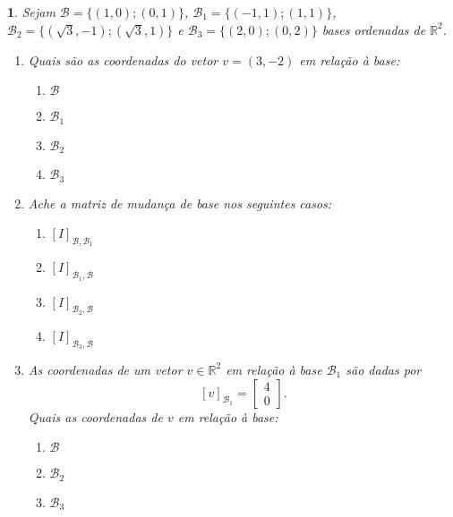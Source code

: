 \documentclass[12pt]{exam}
\newtheorem{exercicio}{}
\newcommand{\real}{\mathbb{R}}
\begin{document}
\begin{exercicio}
  Sejam $\mathcal{B} = \{(1,0);(0,1)\}$, $\mathcal{B}_1 = \{(-1,1);(1,1)\}$, $\mathcal{B}_2 = \{(\sqrt{3},-1);(\sqrt{3},1)\}$ e $\mathcal{B}_3 = \{(2,0);(0,2)\}$ bases ordenadas de $\real^2$.
  \begin{enumerate}[label=({\alph*})]
    \item Quais s\~ao as coordenadas do vetor $v = (3,-2)$ em rela\c{c}\~ao \`a base:
    \begin{enumerate}[label=({\roman*})]
      \item $\mathcal{B}$
      \item $\mathcal{B}_1$
      \item $\mathcal{B}_2$
      \item $\mathcal{B}_3$
    \end{enumerate}
    \item Ache a matriz de mudan\c{c}a de base nos seguintes casos:
    \begin{enumerate}[label=({\roman*})]
      \item $[I]_{\mathcal{B},\mathcal{B}_1}$
      \item $[I]_{\mathcal{B}_1,\mathcal{B}}$
      \item $[I]_{\mathcal{B}_2,\mathcal{B}}$
      \item $[I]_{\mathcal{B}_3,\mathcal{B}}$
    \end{enumerate}
    \item As coordenadas de um vetor $v \in \real^2$ em rela\c{c}\~ao \`a base $\mathcal{B}_1$ s\~ao dadas por
    \[
      [v]_{\mathcal{B}_1} = \begin{bmatrix}
        4\\0
      \end{bmatrix}.
    \]
    Quais as coordenadas de $v$ em rela\c{c}\~ao \`a base:
    \begin{enumerate}[label=({\roman*})]
      \item $\mathcal{B}$
      \item $\mathcal{B}_2$
      \item $\mathcal{B}_3$
    \end{enumerate}
  \end{enumerate}
\end{exercicio}
\end{document}
